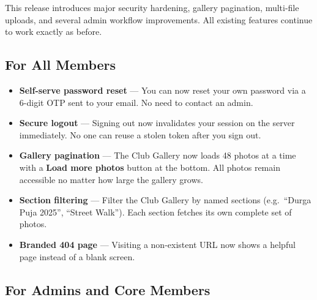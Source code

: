 \documentclass[12pt,a4paper]{article}
\begin{document}
\begin{newbox}
This release introduces major security hardening, gallery pagination, multi-file uploads, and several admin workflow improvements. All existing features continue to work exactly as before.
\end{newbox}

\subsection{For All Members}

\begin{itemize}
  \item \textbf{Self-serve password reset} --- You can now reset your own password via a 6-digit OTP sent to your email. No need to contact an admin.
  \item \textbf{Secure logout} --- Signing out now invalidates your session on the server immediately. No one can reuse a stolen token after you sign out.
  \item \textbf{Gallery pagination} --- The Club Gallery now loads 48 photos at a time with a \textbf{Load more photos} button at the bottom. All photos remain accessible no matter how large the gallery grows.
  \item \textbf{Section filtering} --- Filter the Club Gallery by named sections (e.g.\ ``Durga Puja 2025'', ``Street Walk''). Each section fetches its own complete set of photos.
  \item \textbf{Branded 404 page} --- Visiting a non-existent URL now shows a helpful page instead of a blank screen.
\end{itemize}

\subsection{For Admins and Core Members}
\end{document}
